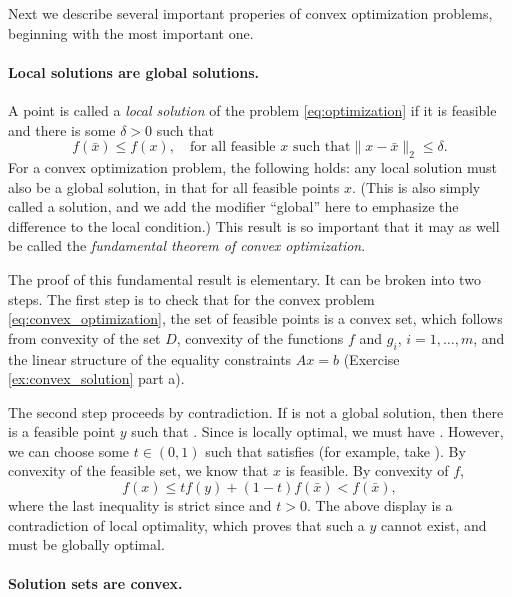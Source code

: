 Next we describe several important properies of convex optimization problems,
beginning with the most important one.

\paragraph{Local solutions are global solutions.} 

A point  is called a \emph{local solution} of the problem
\eqref{eq:optimization} if it is feasible and there is some $\delta>0$ such that 
\[
f(\bar{x}) \leq f(x), \quad \text{for all feasible $x$ such that
$\|x - \bar{x}\|_2 \leq \delta$}.
\]
For a convex optimization problem, the following holds: any local solution
 must also be a global solution, in that  for all feasible points $x$. (This is also simply called a
solution, and we add the modifier ``global'' here to emphasize the difference to
the local condition.) This result is so important that it may as well be called
the \emph{fundamental theorem of convex optimization}. 

The proof of this fundamental result is elementary. It can be broken into two  
steps. The first step is to check that for the convex problem
\eqref{eq:convex_optimization}, the set of feasible points is a convex set,
which follows from convexity of the set $D$, convexity of the functions $f$ and
$g_i$, $i=1,\dots,m$, and the linear structure of the equality constraints 
$Ax=b$ (Exercise \ref{ex:convex_solution} part a).  

The second step proceeds by contradiction. If  is not a global
solution, then there is a feasible point $y$ such that . Since  is locally optimal, we must have
. However, we can choose some $t \in (0,1)$ 
such that  satisfies  (for example, take ).
By convexity of the feasible set, we know that $x$ is feasible. By convexity of
$f$,  
\[
f(x) \leq t f(y) + (1-t) f(\bar{x}) < f(\bar{x}),
\]
where the last inequality is strict since  and
$t>0$. The above display is a contradiction of local optimality, which proves
that such a $y$ cannot exist, and  must be globally optimal. 

\paragraph{Solution sets are convex.} 

